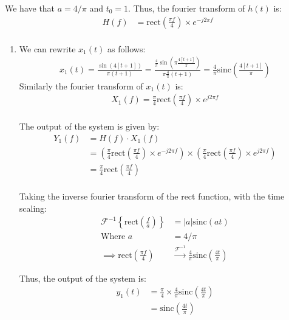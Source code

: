 \documentclass{article}
\begin{document}
We have that $a = 4/\pi$ and $t_0 = 1$. Thus, the fourier transform of $h(t)$ is:
\begin{align*}
    H(f) &= \text{rect}\left(\frac{\pi f}{4}\right) \times e^{-j2\pi f} \\
\end{align*}


\begin{enumerate}[label=2.\arabic*]
    \item We can rewrite $x_1(t)$ as follows:
    \begin{align*}
        x_1(t) = \frac{\sin(4[t+1])}{\pi(t+1)} = \frac{\frac{4}{\pi}\sin\left(\pi \frac{4[t+1]}{\pi}\right)}{\pi \frac{4}{\pi}(t+1)} = \frac{4}{\pi} \text{sinc}\left(\frac{4[t+1]}{\pi}\right)
    \end{align*}
    Similarly the fourier transform of $x_1(t)$ is:
    \begin{align*}
        X_1(f) = \frac{\pi}{4} \text{rect}\left(\frac{\pi f}{4}\right) \times e^{j2\pi f} \\
    \end{align*}

    The output of the system is given by:
    \begin{align*}
        Y_1(f) &= H(f) \cdot X_1(f) \\
        &= \left(\frac{\pi}{4} \text{rect}\left(\frac{\pi f}{4}\right) \times e^{-j2\pi f}\right) \times \left(\frac{\pi}{4} \text{rect}\left(\frac{\pi f}{4}\right) \times e^{j2\pi f}\right) \\
        &= \frac{\pi}{4} \text{rect}\left(\frac{\pi f}{4}\right)\\
    \end{align*}

    Taking the inverse fourier transform of the rect function, with the time scaling:
    \begin{align*}
        \mathcal{F}^{-1}\left\{\text{rect}\left(\frac{f}{a}\right) \right\} &= |a| \text{sinc}(at) \\
        \text{Where } a &= 4/\pi \\
        \implies \text{rect}\left(\frac{\pi f}{4}\right) &\xrightarrow{\mathcal{F}^{-1}} \frac{4}{\pi} \text{sinc}\left(\frac{4t}{\pi}\right)
    \end{align*}

    Thus, the output of the system is:
    \begin{align*}
        y_1(t) &= \frac{\pi}{4} \times \frac{4}{\pi} \text{sinc}\left(\frac{4t}{\pi}\right) \\
        &= \boxed{\text{sinc}\left(\frac{4t}{\pi}\right)}
    \end{align*}


\end{enumerate}
\end{document}
